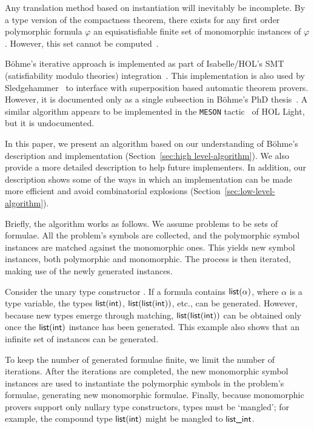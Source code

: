 \documentclass[runningheads]{llncs}
\begin{document}
Any translation method based on instantiation will inevitably be incomplete.
By a type version of the compactness theorem, there exists for any first order polymorphic formula \(\varphi\) an equisatisfiable finite set of monomorphic instances of \(\varphi\). However, this set cannot be computed~\cite[Theorem~1]{expr-poly-types}.

B\"ohme's iterative approach is implemented as part of Isabelle/HOL's SMT (satisfiability modulo theories) integration~\cite[Chapter 2]{sb-phd}. This implementation is also used by Sledgehammer~\cite{judgement,paulson-blanchette-2010} to interface with superposition based automatic theorem provers. However, it is documented only as a single subsection in B\"ohme's PhD thesis~\cite[Section 2.2.1]{sb-phd}.
A similar algorithm appears to be implemented in the \texttt{MESON} tactic~\cite{harrison-1996} of HOL Light, but it is undocumented.

In this paper, we present an algorithm based on our understanding of Böhme's description and implementation (Section~\ref{sec:high level-algorithm}). We also provide a more detailed description to help future implementers. In addition, our description shows some of the ways in which an implementation can be made more efficient and avoid combinatorial explosions (Section~\ref{sec:low-level-algorithm}).

Briefly, the algorithm works as follows. We assume problems to be sets of formulae. All the problem's symbols are collected, and the polymorphic symbol instances are matched against the monomorphic ones. This yields new symbol instances, both polymorphic and monomorphic. The process is then iterated, making use of the newly generated instances.

Consider the unary type constructor . If a formula contains $\textsf{list}(\alpha)$, where $\alpha$ is a type variable, the types $\textsf{list}(\textsf{int})$, $\textsf{list}(\textsf{list}(\textsf{int}))$, etc., can be generated. However, because new types emerge through matching, $\textsf{list}(\textsf{list}(\textsf{int}))$ can be obtained only once the $\textsf{list}(\textsf{int})$ instance has been generated.
This example also shows that an infinite set of instances can be generated.

To keep the number of generated formulae finite, we limit the number of iterations. After the iterations are completed, the new monomorphic symbol instances are used to instantiate the polymorphic symbols in the problem's formulae, generating new monomorphic formulae. Finally, because monomorphic provers support only nullary type constructors, types must be `mangled'; for example, the compound type $\textsf{list}(\textsf{int})$ might be mangled to $\textsf{list\_int}$.
\end{document}
